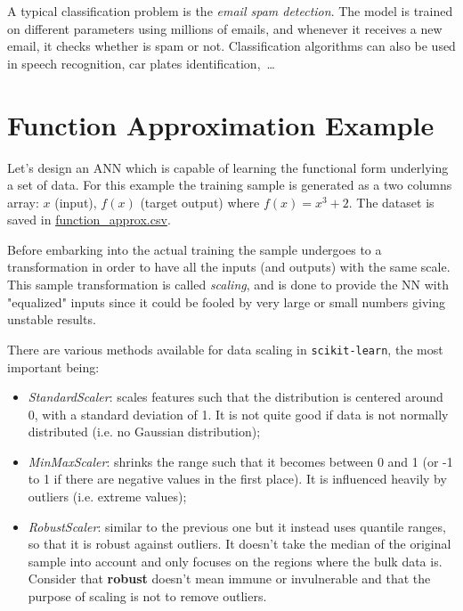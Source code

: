 A typical classification problem is the \emph{email spam detection}. The model is trained on different parameters using millions of emails, and whenever it receives a new email, it checks whether is spam or not. Classification algorithms can also be used in speech recognition, car plates identification,~\ldots

\section{Function Approximation Example}
\label{function-approximation}

Let's design an ANN which is capable of learning the functional form underlying a set of data. For this example the training sample is generated as a two columns array: $x$ (input), $f(x)$ (target output) where $f(x) = x^3 +2$. The dataset is saved in \href{https://github.com/matteosan1/finance_course/raw/develop/libro/input_files/function_approx.csv}{function\_approx.csv}. 

Before embarking into the actual training the sample undergoes to a transformation in order to have all the inputs (and outputs) with the same scale. This sample transformation is called \emph{scaling}, and is done to provide the NN with "equalized" inputs since it could be fooled by very large or small numbers giving unstable results.

There are various methods available for data scaling in \texttt{scikit-learn}, the most important being:
\begin{itemize}
\tightlist
\item \emph{StandardScaler}: scales features such that the distribution is centered around 0, with a standard deviation of 1. It is not quite good if data is not normally distributed (i.e. no Gaussian distribution);
\item \emph{MinMaxScaler}: shrinks the range such that it becomes between 0 and 1 (or -1 to 1 if there are negative values in the first place). It is influenced heavily by outliers (i.e. extreme values);
\item \emph{RobustScaler}: similar to the previous one but it instead uses quantile ranges, so that it is robust against outliers. It doesn't take the median of the original sample into account and only focuses on the regions where the bulk data is. Consider that \textbf{robust} doesn't mean immune or invulnerable and that the purpose of scaling is not to remove outliers.
\end{itemize}


